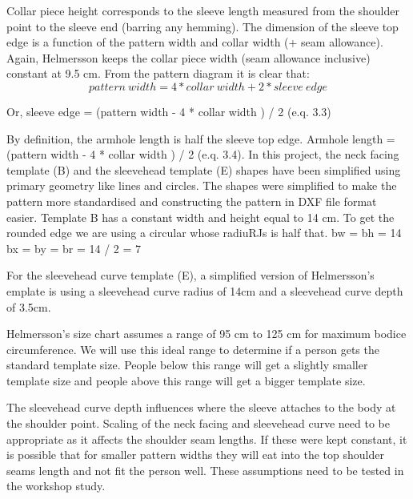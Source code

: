 Collar piece height corresponds to the sleeve length measured from the shoulder point to the sleeve end (barring any hemming). The dimension of the sleeve top edge is a function of the pattern width and collar width (+ seam allowance). Again, Helmersson keeps the collar piece width (seam allowance inclusive) constant at 9.5 cm. From the pattern diagram it is clear that:
\begin{equation}
    pattern\ width = 4 * collar\ width + 2 * sleeve\ edge
    \label{eq:pattern width collar}
\end{equation}
	
	Or, sleeve edge = (pattern width - 4 * collar width ) / 2  (e.q. 3.3)

By definition, the armhole length is half the sleeve top edge.
	Armhole length = (pattern width - 4 * collar width ) / 2  (e.q. 3.4).
In this project, the neck facing template (B) and the sleevehead template (E) shapes have been simplified using primary geometry like lines and circles. The shapes were simplified to make the pattern more standardised and constructing the pattern in DXF file format easier. 
Template B has a constant width and height equal to 14 cm. To get the rounded edge we are using a circular whose radiuRJs is half that. 
	bw = bh = 14
	bx = by = br = 14 / 2 = 7

For the sleevehead curve template (E),  a simplified version of Helmersson’s emplate is using a sleevehead curve radius of 14cm and a sleevehead curve depth of 3.5cm.

Helmersson’s size chart assumes a range of 95 cm to 125 cm for maximum bodice circumference. We will use this ideal range to determine if a person gets the standard template size. People below this range will get a slightly smaller template size and people above this range will get a bigger template size. 

The sleevehead curve depth influences where the sleeve attaches to the body at the shoulder point. Scaling of the neck facing and sleevehead curve need to be appropriate as it affects the shoulder seam lengths. If these were kept constant, it is possible that for smaller pattern widths they will eat into the top shoulder seams length and not fit the person well. These assumptions need to be tested in the workshop study. 


